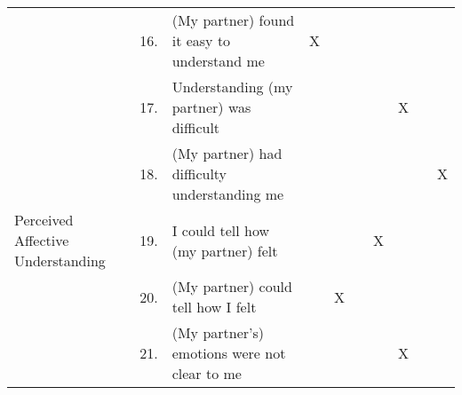 \begin{table}[h]
\begin{tabular}{@{}lcl|ccccccc@{}}
                                     & 16.      & (My partner) found it easy to understand me                                & X                                                            &          &                                                              &         &                                                           &       &                                                           \\
                                     & 17.      & Understanding (my partner) was difficult                                   &                                                              &          &                                                              &         & X                                                         &       &                                                           \\
                                     & 18.      & (My partner) had difficulty understanding me                               &                                                              &          &                                                              &         &                                                           &       & X                                                         \\ \midrule
Perceived Affective Understanding    & 19.      & I could tell how (my partner) felt                                         &                                                              &          &                                                              & X       &                                                           &       &                                                           \\
                                     & 20.      & (My partner) could tell how I felt                                         &                                                              & X        &                                                              &         &                                                           &       &                                                           \\
                                     & 21.      & (My partner's) emotions were not clear to me                               &                                                              &          &                                                              &         & X                                                         &       &                                                           \\

\end{tabular}
\end{table}
